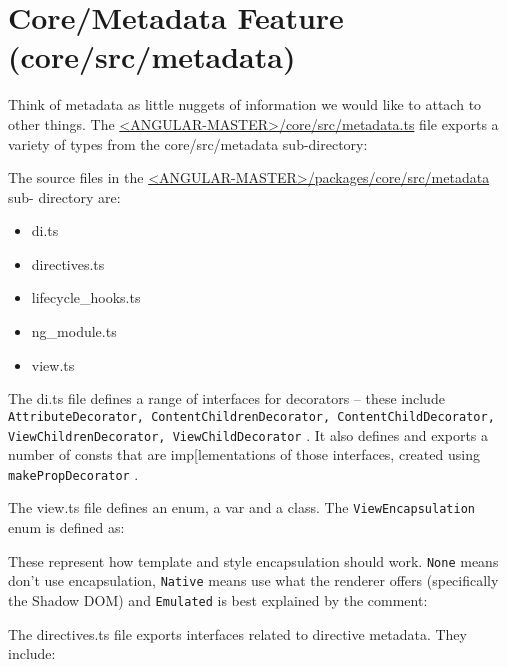 \section{Core/Metadata Feature (core/src/metadata)}

Think of metadata as little nuggets of information we would like to attach to other
things. The
\href{https://github.com/angular/angular/blob/master/packages/core/src/metadata.ts}
{<ANGULAR-MASTER>/core/src/metadata.ts}
file exports a variety of types
from the core/src/metadata sub-directory:



The source files in the
\href{https://github.com/angular/angular/tree/master/packages/core/src/metadata}
{<ANGULAR-MASTER>/packages/core/src/metadata}
sub-
directory are:

\begin{itemize}
  \item di.ts
  \item directives.ts
  \item lifecycle\_hooks.ts
  \item ng\_module.ts
  \item view.ts
\end{itemize}

The di.ts file defines a range of interfaces for decorators – these include
\texttt{AttributeDecorator, ContentChildrenDecorator, ContentChildDecorator,}
\texttt{ViewChildrenDecorator, ViewChildDecorator}
. It also defines and exports a
number of consts that are imp[lementations of those interfaces, created using
\texttt{makePropDecorator}
.

The view.ts file defines an enum, a var and a class. The
\texttt{ViewEncapsulation}
enum is
defined as:



These represent how template and style encapsulation should work.
\texttt{None}
means don’t
use encapsulation,
\texttt{Native}
means use what the renderer offers (specifically the
Shadow DOM) and
\texttt{Emulated}
is best explained by the comment:



The directives.ts file exports interfaces related to directive metadata. They include:

